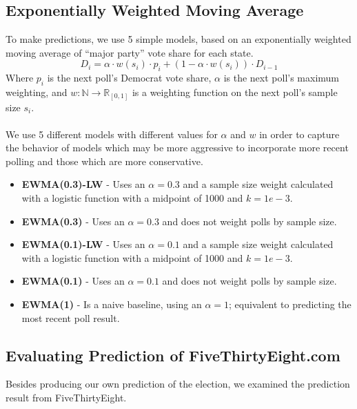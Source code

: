 \subsection{Exponentially Weighted Moving Average}
To make predictions, we use 5 simple models, based on an exponentially weighted moving average of ``major party'' vote share for each state.
$$
D_i = \alpha\cdot w(s_i) \cdot p_{i} + (1-\alpha\cdot w(s_i)) \cdot D_{i-1}
$$
Where $p_i$ is the next poll's Democrat vote share, $\alpha$ is the next poll's maximum weighting, and $w: \mathbb{N} \rightarrow \mathbb{R}_{[0, 1]}$ is a weighting function on the next poll's sample size $s_i$.
\\~\\
We use 5 different models with different values for $\alpha$ and $w$ in order to capture the behavior of models which may be more aggressive to incorporate more recent polling and those which are more conservative. 

\begin{itemize}
    \item {\bf EWMA(0.3)-LW} - Uses an $\alpha = 0.3$ and a sample size weight calculated with a logistic function with a midpoint of 1000 and $k=1e-3$.
    \item {\bf EWMA(0.3)} - Uses an $\alpha = 0.3$ and does not weight polls by sample size.
    \item {\bf EWMA(0.1)-LW} - Uses an $\alpha = 0.1$ and a sample size weight calculated with a logistic function with a midpoint of 1000 and $k=1e-3$.
    \item {\bf EWMA(0.1)} - Uses an $\alpha = 0.1$ and does not weight polls by sample size.
    \item {\bf EWMA(1)} - Is a naive baseline, using an $\alpha = 1$; equivalent to predicting the most recent poll result.
\end{itemize}


\subsection{Evaluating Prediction of FiveThirtyEight.com}

Besides producing our own prediction of the election, we examined the prediction result from FiveThirtyEight. 


